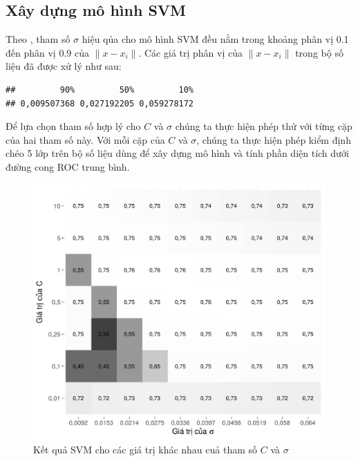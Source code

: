 \documentclass[a4paper]{report}\usepackage[]{graphicx}\usepackage[]{color}
\makeatletter
\newenvironment{kframe}{%
 \def\at@end@of@kframe{}%
 \ifinner\ifhmode%
  \def\at@end@of@kframe{\end{minipage}}%
  \begin{minipage}{\columnwidth}%
 \fi\fi%
 \def\FrameCommand##1{\hskip\@totalleftmargin \hskip-\fboxsep
 \colorbox{shadecolor}{##1}\hskip-\fboxsep
     \hskip-\linewidth \hskip-\@totalleftmargin \hskip\columnwidth}%
 \MakeFramed {\advance\hsize-\width
   \@totalleftmargin\z@ \linewidth\hsize
   \@setminipage}}%
 {\par\unskip\endMakeFramed%
 \at@end@of@kframe}
\newenvironment{knitrout}{}{} %
\makeatother
\begin{document}
\subsection{Xây dựng mô hình SVM}
Theo \textcite{963105}, tham số $\sigma$ hiệu qủa cho mô hình SVM đều nằm trong khoảng phân vị 0.1 đến phân vị 0.9 của $\|x - x_i\|$. Các giá trị phân vị của $\|x - x_i\|$ trong bộ số liệu đã được xử lý như sau:

\begin{knitrout}\small
{}\color{fgcolor}\begin{kframe}
\begin{verbatim}
##         90%         50%         10% 
## 0,009507368 0,027192205 0,059278172
\end{verbatim}
\end{kframe}
\end{knitrout}



Để lựa chọn tham số hợp lý cho $C$ và $\sigma$ chúng ta thực hiện phép thử với từng cặp của hai tham số này. Với mỗi cặp của $C$ và $\sigma$, chúng ta thực hiện phép kiểm định chéo 5 lớp trên bộ số liệu dùng để xây dựng mô hình và tính phần diện tích dưới đường cong ROC trung bình.

\begin{figure}[h]
\centering
\capstart
\begin{knitrout}\small
{}\color{fgcolor}
\includegraphics[width=\textwidth]{Figures/svm_train-1} 

\end{knitrout}
\caption{Kết quả SVM cho các giá trị khác nhau cuả tham số $C$ và $\sigma$}
\label{fig:svm_train}
\end{figure}
\end{document}
